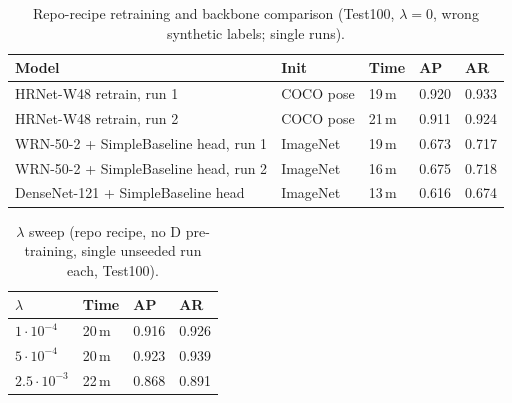 \documentclass[10pt]{article}
\begin{document}
\begin{table}[h]\centering\small
\caption{Repo-recipe retraining and backbone comparison (Test100, $\lambda=0$, wrong synthetic labels; single runs).}
\begin{tabularx}{\linewidth}{X l l l l}
\toprule
Model & Init & Time & AP & AR \\
\midrule
HRNet-W48 retrain, run 1 & COCO pose & 19\,m & 0.920 & 0.933 \\
HRNet-W48 retrain, run 2 & COCO pose & 21\,m & 0.911 & 0.924 \\
WRN-50-2 + SimpleBaseline head, run 1 & ImageNet & 19\,m & 0.673 & 0.717 \\
WRN-50-2 + SimpleBaseline head, run 2 & ImageNet & 16\,m & 0.675 & 0.718 \\
DenseNet-121 + SimpleBaseline head & ImageNet & 13\,m & 0.616 & 0.674 \\
\bottomrule
\end{tabularx}
\end{table}

\begin{table}[h]\centering\small
\caption{$\lambda$ sweep (repo recipe, no D pre-training, single unseeded run each, Test100).}
\begin{tabular}{llll}
\toprule
$\lambda$ & Time & AP & AR \\
\midrule
$1\cdot10^{-4}$ & 20\,m & 0.916 & 0.926 \\
$5\cdot10^{-4}$ & 20\,m & 0.923 & 0.939 \\
$2.5\cdot10^{-3}$ & 22\,m & 0.868 & 0.891 \\
\bottomrule
\end{tabular}
\end{table}
\end{document}
